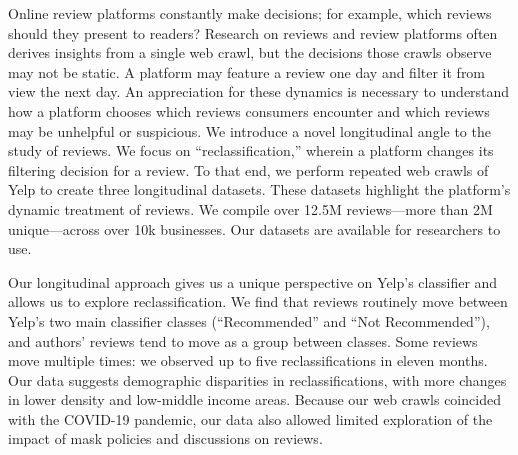 Online review platforms constantly make decisions; for example, which reviews should they present to readers? Research on reviews and review platforms often derives insights from a single web crawl, but the decisions those crawls observe may not be static. A platform may feature a review one day and filter it from view the next day. An appreciation for these dynamics is necessary to understand how a platform chooses which reviews consumers encounter and which reviews may be unhelpful or suspicious. We introduce a novel longitudinal angle to the study of reviews. We focus on ``reclassification,'' wherein a platform changes its filtering decision for a review. To that end, we perform repeated web crawls of Yelp to create three longitudinal datasets. These datasets highlight the platform's dynamic treatment of reviews. We compile over 12.5M reviews---more than 2M unique---across over 10k businesses. Our datasets are available for researchers to use.

Our longitudinal approach gives us a unique perspective on Yelp's classifier and allows us to explore reclassification. We find that reviews routinely move between Yelp's two main classifier classes (``Recommended'' and ``Not Recommended''), and authors' reviews tend to move as a group between classes. Some reviews move multiple times: we observed up to five reclassifications in eleven months. Our data suggests demographic disparities in reclassifications, with more changes in lower density and low-middle income areas. Because our web crawls coincided with the COVID-19 pandemic, our data also allowed limited exploration of the impact of mask policies and discussions on reviews.